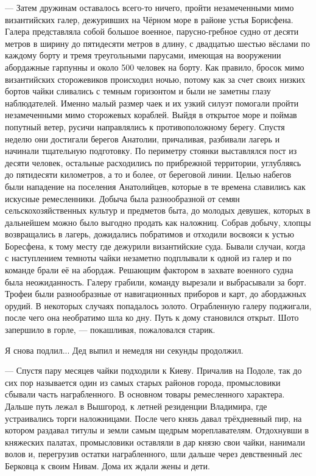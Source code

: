 — Затем дружинам оставалось всего-то ничего, пройти незамеченными мимо
византийских галер, дежуривших на Чёрном море в районе устья Борисфена. Галера
представляла собой большое военное, парусно-гребное судно от десяти метров в
ширину до пятидесяти метров в длину, с двадцатью шестью вёслами по каждому
борту и тремя треугольными парусами, имеющая на вооружении абордажные гарпунны
и около 500 человек на борту. Как правило, бросок мимо византийских
сторожевиков происходил ночью, потому как за счет своих низких бортов чайки
сливались с темным горизонтом и были не заметны глазу наблюдателей. Именно
малый размер чаек и их узкий силуэт помогали пройти незамеченными мимо
сторожевых кораблей. Выйдя в открытое море и поймав попутный ветер, русичи
направлялись к противоположному берегу. Спустя неделю они достигали берегов
Анатолии, причаливая, разбивали лагерь и начинали тщательную подготовку. По
периметру стоянки выставлялся пост из десяти человек, остальные расходились по
прибрежной территории, углубляясь до пятидесяти километров, а то и более, от
береговой линии. Целью набегов были нападение на поселения Анатолийцев, которые
в те времена славились как искусные ремесленники. Добыча была разнообразной от
семян сельскохозяйственных культур и предметов быта, до молодых девушек,
которых в дальнейшем можно было выгодно продать как наложниц. Собрав добычу,
хлопцы возвращались в лагерь, дожидались побратимов и отходили восвояси к устью
Боресфена, к тому месту где дежурили византийские суда. Бывали случаи, когда с
наступлением темноты чайки незаметно подплывали к одной из галер и по команде
брали её на абордаж. Решающим фактором в захвате военного судна была
неожиданность. Галеру грабили, команду вырезали и выбрасывали за борт. Трофеи
были разнообразные от навигационных приборов и карт, до абордажных орудий. В
некоторых случаях попадалось золото. Ограбленную галеру поджигали, после чего
она необратимо шла ко дну. Путь к дому становился открыт. Шото запершило в
горле, — покашливая, пожаловался старик.

Я снова подлил... Дед выпил и немедля ни секунды продолжил.

— Спустя пару месяцев чайки подходили к Киеву. Причалив на Подоле, так до сих
пор называется один из самых старых районов города, промысловики сбывали часть
награбленного. В основном товары ремесленного характера. Дальше путь лежал в
Вышгород, к летней резиденции Владимира, где устраивались торги наложницами.
После чего князь давал трёхдневный пир, на котором раздавал титулы и земли
самым щедрым мореплавателям. Отдохнувши в княжеских палатах, промысловики
оставляли в дар князю свои чайки, нанимали волов и, перегрузив остатки
награбленного, шли дальше через девственный лес Берковца к своим Нивам. Дома их
ждали жены и дети.

